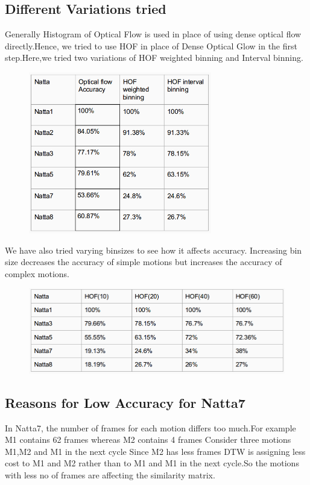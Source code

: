 \subsection{Different Variations tried}

Generally Histogram of Optical Flow is used in place of using dense optical flow directly.Hence, we tried to use HOF in place of Dense Optical Glow in the first step.Here,we tried two variations of HOF weighted binning and Interval binning.

\begin{figure} [H]
\centering
\includegraphics[width=80mm]{Pictures/res2.png}
\end{figure}

We have also tried varying binsizes to see how it affects accuracy. Increasing bin size decreases the accuracy of simple motions but increases the accuracy of complex motions.

\begin{figure} [H]
\centering
\includegraphics[width=120mm]{Pictures/res3.png}
\end{figure}

\subsection{Reasons for Low Accuracy for Natta7}

In Natta7, the number of frames for each motion differs too much.For example M1 contains 62 frames whereas M2 contains 4 frames 
Consider three motions M1,M2 and M1 in the next cycle
Since M2 has less frames DTW is assigning less cost to M1 and M2 rather than to M1 and M1 in the next cycle.So the motions with less no of frames are affecting the similarity matrix.

